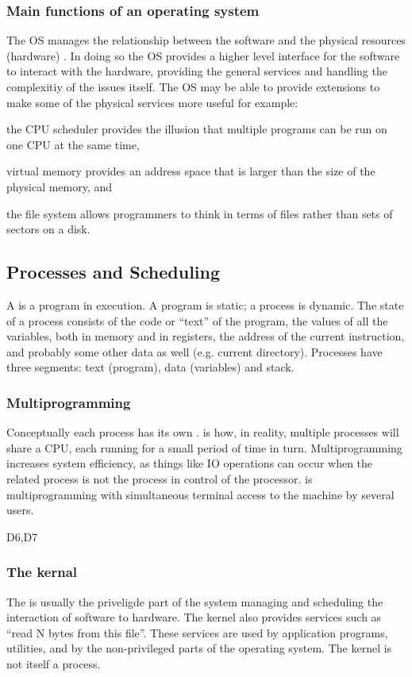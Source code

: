 \subsubsection{Main functions of an operating system}
The OS manages the relationship between the software and the physical resources (hardware) . In doing so the OS provides a higher level interface for the software to interact with the hardware, providing the general services and handling the complexitiy of the issues itself. The OS may be able to provide extensions to make some of the physical services more useful for example:
\begin{compactitem}
\item the CPU scheduler provides the illusion that multiple programs can be
run on one CPU at the same time,
\item virtual memory provides an address space that is larger than the size
of the physical memory, and
\item the file system allows programmers to think in terms of files rather
than sets of sectors on a disk. \end{compactitem}

\subsection{Processes and Scheduling}
A  is a program in execution.
A program is static; a process is dynamic. 
The state of a process consists of the code or “text” of the program, the
values of all the variables, both in memory and in registers, the address of
the current instruction, and probably some other data as well (e.g. current
directory). Processes have three segments: text (program), data (variables) and stack.

\subsubsection{Multiprogramming}
Conceptually each process has its own .  is how, in reality, multiple processes will share a CPU, each running for a small
period of time in turn. Multiprogramming increases system efficiency, as things like IO operations can occur when the related process is not the process in control of the processor.
 is multiprogramming with simultaneous terminal access to
the machine by several users.

D6,D7

\subsubsection{The kernal}
The  is usually the priveligde part of the system managing and scheduling the interaction of software to hardware.
The kernel also provides services such as “read N bytes from this file”.
These services are used by application programs, utilities, and by the
non-privileged parts of the operating system.
The kernel is not itself a process.

